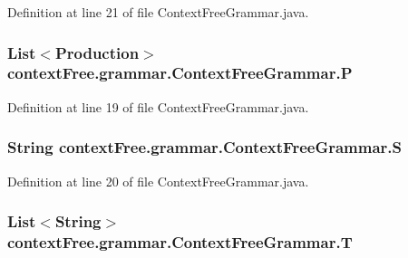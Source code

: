 Definition at line 21 of file Context\-Free\-Grammar.\-java.

\hypertarget{classcontext_free_1_1grammar_1_1_context_free_grammar_ae1f4363ca57c34622cdca5175aef6b6c}{
\subsubsection[{P}]{\setlength{\rightskip}{0pt plus 5cm}List$<${\bf Production}$>$ {\bf context\-Free.\-grammar.\-Context\-Free\-Grammar.\-P}}}\label{classcontext_free_1_1grammar_1_1_context_free_grammar_ae1f4363ca57c34622cdca5175aef6b6c}


Definition at line 19 of file Context\-Free\-Grammar.\-java.

\hypertarget{classcontext_free_1_1grammar_1_1_context_free_grammar_a516b9fb1183524ea3e7859b41f60ad32}{
\subsubsection[{S}]{\setlength{\rightskip}{0pt plus 5cm}String {\bf context\-Free.\-grammar.\-Context\-Free\-Grammar.\-S}}}\label{classcontext_free_1_1grammar_1_1_context_free_grammar_a516b9fb1183524ea3e7859b41f60ad32}


Definition at line 20 of file Context\-Free\-Grammar.\-java.

\hypertarget{classcontext_free_1_1grammar_1_1_context_free_grammar_a5e6072d2c2f11703160c3c39c2968489}{
\subsubsection[{T}]{\setlength{\rightskip}{0pt plus 5cm}List$<$String$>$ {\bf context\-Free.\-grammar.\-Context\-Free\-Grammar.\-T}}}\label{classcontext_free_1_1grammar_1_1_context_free_grammar_a5e6072d2c2f11703160c3c39c2968489}



